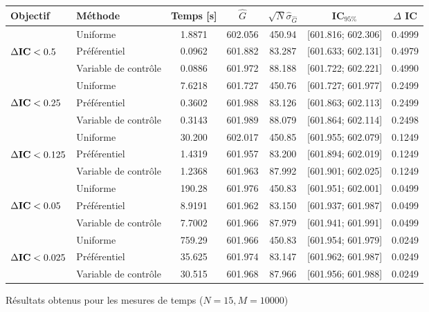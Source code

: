 \documentclass[a4paper,11pt]{article}
\begin{document}
\begin{figure}[h]
\bgroup
\def\arraystretch{1.2}
\begin{center}
\begin{tabular}{|llccccc|}
	\hline
	\textbf{Objectif} & \textbf{Méthode} & \textbf{Temps} [s] & $\hat{G}$ & $\sqrt{N}\hat{\sigma}_{\hat{G}}$ & \textbf{IC$_{95\%}$} & \textbf{$\Delta$ IC}\\
	\hline
	                                  & Uniforme             & 1.8871 & 602.056 & 450.94 & [601.816; 602.306] & 0.4999\\
	$\Delta\text{\bfseries IC} < 0.5$ & Préférentiel         & 0.0962 & 601.882 & 83.287 & [601.633; 602.131] & 0.4979\\
	                                  & Variable de contrôle & 0.0886 & 601.972 & 88.188 & [601.722; 602.221] & 0.4990\\
	\hline
	                                   & Uniforme             & 7.6218 & 601.727 & 450.76 & [601.727; 601.977] & 0.2499\\
	$\Delta\text{\bfseries IC} < 0.25$ & Préférentiel         & 0.3602 & 601.988 & 83.126 & [601.863; 602.113] & 0.2499\\
	                                   & Variable de contrôle & 0.3143 & 601.989 & 88.079 & [601.864; 602.114] & 0.2498\\
	\hline
	                                    & Uniforme             & 30.200 & 602.017 & 450.85 & [601.955; 602.079] & 0.1249\\
	$\Delta\text{\bfseries IC} < 0.125$ & Préférentiel         & 1.4319 & 601.957 & 83.200 & [601.894; 602.019] & 0.1249\\
	                                    & Variable de contrôle & 1.2368 & 601.963 & 87.992 & [601.901; 602.025] & 0.1249\\
	\hline
	                                   & Uniforme             & 190.28 & 601.976 & 450.83 & [601.951; 602.001] & 0.0499\\
	$\Delta\text{\bfseries IC} < 0.05$ & Préférentiel         & 8.9191 & 601.962 & 83.150 & [601.937; 601.987] & 0.0499\\
	                                   & Variable de contrôle & 7.7002 & 601.966 & 87.979 & [601.941; 601.991] & 0.0499\\
	\hline
	                                    & Uniforme             & 759.29 & 601.966 & 450.83 & [601.954; 601.979] & 0.0249\\
	$\Delta\text{\bfseries IC} < 0.025$ & Préférentiel         & 35.625 & 601.974 & 83.147 & [601.962; 601.987] & 0.0249\\
	                                    & Variable de contrôle & 30.515 & 601.968 & 87.966 & [601.956; 601.988] & 0.0249\\
	\hline
\end{tabular}
\end{center}
\egroup
\caption{Résultats obtenus pour les mesures de temps ($N=15,M=10000$)}
\end{figure}
\end{document}
